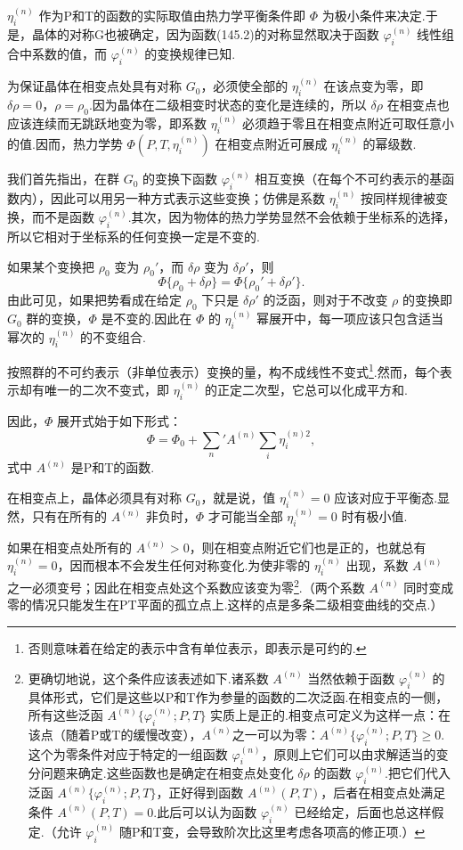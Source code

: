 $\eta_i^{(n)}$ 作为P和T的函数的实际取值由热力学平衡条件即 $\Phi$ 为极小条件来决定.于是，晶体的对称G也被确定，因为函数(145.2)的对称显然取决于函数 $\varphi_i^{(n)}$ 线性组合中系数的值，而 $\varphi_i^{(n)}$ 的变换规律已知.

为保证晶体在相变点处具有对称 $G_0$，必须使全部的 $\eta_i^{(n)}$ 在该点变为零，即 $\delta\rho=0$，$\rho=\rho_0$.因为晶体在二级相变时状态的变化是连续的，所以 $\delta\rho$ 在相变点也应该连续而无跳跃地变为零，即系数 $\eta_i^{(n)}$ 必须趋于零且在相变点附近可取任意小的值.因而，热力学势 $\Phi(P,T,\eta_i^{(n)})$ 在相变点附近可展成 $\eta_i^{(n)}$ 的幂级数.

我们首先指出，在群 $G_0$ 的变换下函数 $\varphi_i^{(n)}$ 相互变换（在每个不可约表示的基函数内），因此可以用另一种方式表示这些变换；仿佛是系数 $\eta_i^{(n)}$ 按同样规律被变换，而不是函数 $\varphi_i^{(n)}$.其次，因为物体的热力学势显然不会依赖于坐标系的选择，所以它相对于坐标系的任何变换一定是不变的.

如果某个变换把 $\rho_0$ 变为 $\rho_0'$，而 $\delta\rho$ 变为 $\delta\rho'$，则
\begin{equation*}
  \Phi\{\rho_0+\delta\rho\}=\Phi\{\rho_0'+\delta\rho'\}.
\end{equation*}
由此可见，如果把势看成在给定 $\rho_0$ 下只是 $\delta\rho'$ 的泛函，则对于不改变 $\rho$ 的变换即 $G_0$ 群的变换，$\Phi$ 是不变的.因此在 $\Phi$ 的 $\eta_i^{(n)}$ 幂展开中，每一项应该只包含适当幂次的 $\eta_i^{(n)}$ 的不变组合.

按照群的不可约表示（非单位表示）变换的量，构不成线性不变式\footnote{否则意味着在给定的表示中含有单位表示，即表示是可约的.}.然而，每个表示却有唯一的二次不变式，即 $\eta_i^{(n)}$ 的正定二次型，它总可以化成平方和.

因此，$\Phi$ 展开式始于如下形式：
\begin{equation}
  \Phi=\Phi_0+\sum_n'A^{(n)}\sum_i\eta_i^{(n)2},
\end{equation}
式中 $A^{(n)}$ 是P和T的函数.

在相变点上，晶体必须具有对称 $G_0$，就是说，值 $\eta_i^{(n)}=0$ 应该对应于平衡态.显然，只有在所有的 $A^{(n)}$ 非负时，$\Phi$ 才可能当全部 $\eta_i^{(n)}=0$ 时有极小值.

如果在相变点处所有的 $A^{(n)}>0$，则在相变点附近它们也是正的，也就总有 $\eta_i^{(n)}=0$，因而根本不会发生任何对称变化.为使非零的 $\eta_i^{(n)}$ 出现，系数 $A^{(n)}$ 之一必须变号；因此在相变点处这个系数应该变为零\footnote{更确切地说，这个条件应该表述如下.诸系数 $A^{(n)}$ 当然依赖于函数 $\varphi_i^{(n)}$ 的具体形式，它们是这些以P和T作为参量的函数的二次泛函.在相变点的一侧，所有这些泛函 $A^{(n)}\{\varphi_i^{(n)};P,T\}$ 实质上是正的.相变点可定义为这样一点：在该点（随着P或T的缓慢改变），$A^{(n)}$之一可以为零：$A^{(n)}\{\varphi_i^{(n)};P,T\}\geqslant0$.这个为零条件对应于特定的一组函数 $\varphi_i^{(n)}$，原则上它们可以由求解适当的变分问题来确定.这些函数也是确定在相变点处变化 $\delta\rho$ 的函数 $\varphi_i^{(n)}$.把它们代入泛函 $A^{(n)}\{\varphi_i^{(n)};P,T\}$，正好得到函数 $A^{(n)}(P,T)$，后者在相变点处满足条件 $A^{(n)}(P,T)=0$.此后可以认为函数 $\varphi_i^{(n)}$ 已经给定，后面也总这样假定.（允许 $\varphi_i^{(n)}$ 随P和T变，会导致阶次比这里考虑各项高的修正项.）}.（两个系数 $A^{(n)}$ 同时变成零的情况只能发生在PT平面的孤立点上.这样的点是多条二级相变曲线的交点.）

